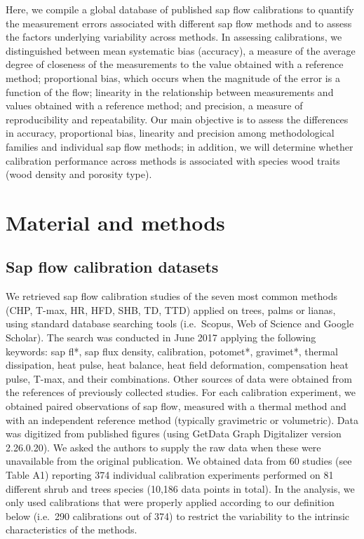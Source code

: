 \documentclass[11pt,twoside]{reedthesis}
\begin{document}
Here, we compile a global database of published sap flow calibrations to
quantify the measurement errors associated with different sap flow
methods and to assess the factors underlying variability across methods.
In assessing calibrations, we distinguished between mean systematic bias
(accuracy), a measure of the average degree of closeness of the
measurements to the value obtained with a reference method; proportional
bias, which occurs when the magnitude of the error is a function of the
flow; linearity in the relationship between measurements and values
obtained with a reference method; and precision, a measure of
reproducibility and repeatability. Our main objective is to assess the
differences in accuracy, proportional bias, linearity and precision
among methodological families and individual sap flow methods; in
addition, we will determine whether calibration performance across
methods is associated with species wood traits (wood density and
porosity type).\par

\section{Material and methods}\label{material-and-methods}

\subsection{Sap flow calibration
datasets}\label{sap-flow-calibration-datasets}

We retrieved sap flow calibration studies of the seven most common
methods (CHP, T-max, HR, HFD, SHB, TD, TTD) applied on trees, palms or
lianas, using standard database searching tools (i.e.~Scopus, Web of
Science and Google Scholar). The search was conducted in June 2017
applying the following keywords: sap fl*, sap flux density, calibration,
potomet*, gravimet*, thermal dissipation, heat pulse, heat balance, heat
field deformation, compensation heat pulse, T-max, and their
combinations. Other sources of data were obtained from the references of
previously collected studies. For each calibration experiment, we
obtained paired observations of sap flow, measured with a thermal method
and with an independent reference method (typically gravimetric or
volumetric). Data was digitized from published figures (using GetData
Graph Digitalizer version 2.26.0.20). We asked the authors to supply the
raw data when these were unavailable from the original publication. We
obtained data from 60 studies (see Table A1) reporting 374 individual
calibration experiments performed on 81 different shrub and trees
species (10,186 data points in total). In the analysis, we only used
calibrations that were properly applied according to our definition
below (i.e.~290 calibrations out of 374) to restrict the variability to
the intrinsic characteristics of the methods.\par
\end{document}
